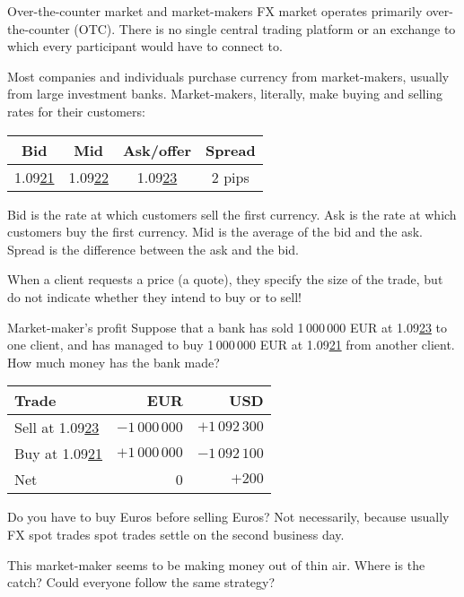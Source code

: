 \documentclass{beamer}
\begin{document}
\begin{frame}{Over-the-counter market and market-makers}
\justify
FX market operates primarily \alert{over-the-counter (OTC)}. There is no single central trading platform or an exchange to which every participant would have to connect to.

\justify
Most companies and individuals purchase currency from market-makers, usually from large investment banks. \alert{Market-makers}, literally, make buying and selling rates for their customers:

\centering
\begin{tabular}{c|c|c|c}
Bid & Mid & Ask/offer & Spread \\ \hline
1.09\underline{21} & 1.09\underline{22} & 1.09\underline{23} & 2 pips
\end{tabular}

\justify
\alert{Bid} is the rate at which customers sell the first currency. \alert{Ask} is the rate at which customers buy the first currency. \alert{Mid} is the average of the bid and the ask. \alert{Spread} is the difference between the ask and the bid.

\justify
When a client requests a price (a quote), they specify the size of the trade, but do not indicate whether they intend to buy or to sell!
\end{frame}



\begin{frame}{Market-maker's profit}
\justify
Suppose that a bank has sold 1\,000\,000 EUR at 1.09\underline{23} to one client, and has managed to buy 1\,000\,000 EUR at 1.09\underline{21} from another client. How much money has the bank made?

\centering
\begin{tabular}{l|r|r}
Trade & EUR & USD \\
\hline
Sell at 1.09\underline{23} & $-1\,000\,000$ & $+1\,092\,300$ \\
Buy at 1.09\underline{21} & $+1\,000\,000$ & $-1\,092\,100$ \\
\hline
Net & 0 & $+200$
\end{tabular}

\justify
Do you have to buy Euros before selling Euros? Not necessarily, because usually FX spot trades spot trades settle on the second business day.

\justify
This market-maker seems to be making money out of thin air. Where is the catch? Could everyone follow the same strategy?
\end{frame}
\end{document}
